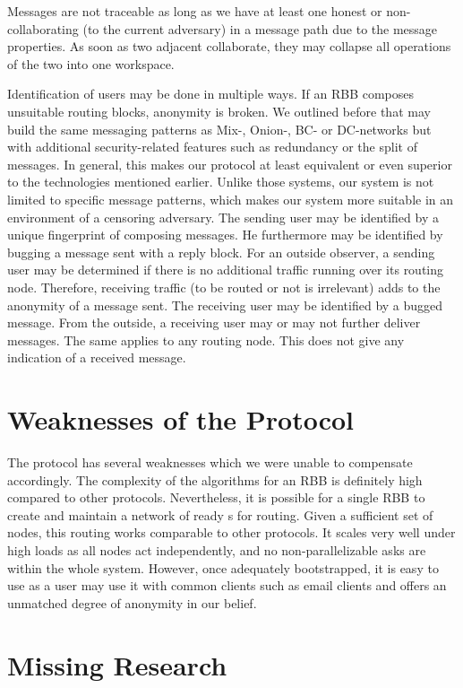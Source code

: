 Messages are not traceable as long as we have at least one honest or non-collaborating (to the current adversary) \VortexNode{} in a message path due to the message properties. As soon as two adjacent \VortexNodes{} collaborate, they may collapse all operations of the two into one workspace.

Identification of \MessageVortex{} users may be done in multiple ways. If an RBB composes unsuitable routing blocks, anonymity is broken. We outlined before that \MessageVortex{} may build the same messaging patterns as Mix-, Onion-, BC- or DC-networks but with additional security-related features such as redundancy or the split of messages. In general, this makes our protocol at least equivalent or even superior to the technologies mentioned earlier. Unlike those systems, our system is not limited to specific message patterns, which makes our system more suitable in an environment of a censoring adversary. The sending user may be identified by a unique fingerprint of composing messages. He furthermore may be identified by bugging a message sent with a reply block. For an outside observer, a sending user may be determined if there is no additional traffic running over its routing node. Therefore, receiving traffic (to be routed or not is irrelevant) adds to the anonymity of a message sent. The receiving user may be identified by a bugged message. From the outside, a receiving user may or may not further deliver messages. The same applies to any routing node. This does not give any indication of a received message.

\chapter{Weaknesses of the Protocol}
The protocol has several weaknesses which we were unable to compensate accordingly. The complexity of the algorithms for an RBB is definitely high compared to other protocols. Nevertheless, it is possible for a single RBB to create and maintain a network of ready s for routing. Given a sufficient set of nodes, this routing works comparable to other protocols. It scales very well under high loads as all nodes act independently, and no non-parallelizable asks are within the whole system. However, once adequately bootstrapped, it is easy to use as a user may use it with common clients such as email clients and offers an unmatched degree of anonymity in our belief.

\chapter{Missing Research}

